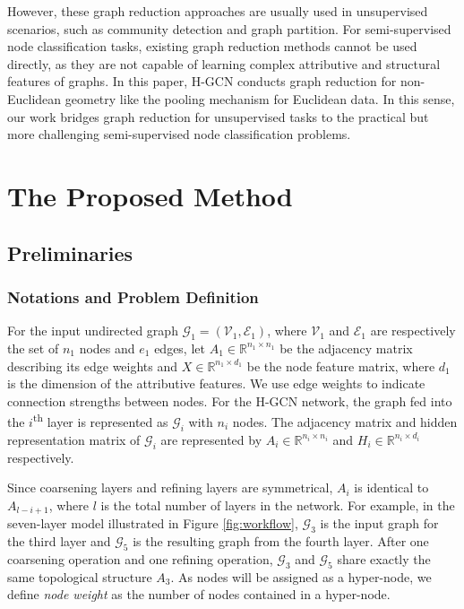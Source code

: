 \documentclass{article}
\begin{document}
However, these graph reduction approaches are usually used in unsupervised scenarios, such as community detection and graph partition. For semi-supervised node classification tasks, existing graph reduction methods cannot be used directly, as they are not capable of learning complex attributive and structural features of graphs. In this paper, H-GCN conducts graph reduction for non-Euclidean geometry like the pooling mechanism for Euclidean data. In this sense, our work bridges graph reduction for unsupervised tasks to the practical but more challenging semi-supervised node classification problems.
 \section{The Proposed Method}

\subsection{Preliminaries}

\subsubsection{Notations and Problem Definition}

For the input undirected graph $\mathcal{G}_1 = (\mathcal{V}_1, \mathcal{E}_1)$, where $\mathcal{V}_1$ and $\mathcal{E}_1$ are respectively the set of $n_1$ nodes and $e_1$ edges, let $A_1 \in \mathbb{R}^{n_1 \times n_1}$ be the adjacency matrix describing its edge weights and $X \in \mathbb{R}^{n_1 \times d_1}$ be the node feature matrix, where $d_1$ is the dimension of the attributive features. We use edge weights to indicate connection strengths between nodes. For the H-GCN network, the graph fed into the $i$\textsuperscript{th} layer is represented as $\mathcal{G}_i$ with $n_i$ nodes. The adjacency matrix and hidden representation matrix of $\mathcal{G}_i$ are represented by $A_i \in \mathbb{R}^{n_i \times n_i}$ and $H_i \in \mathbb{R}^{n_i \times d_i}$ respectively.

Since coarsening layers and refining layers are symmetrical, $A_i$ is identical to $A_{l - i + 1}$, where $l$ is the total number of layers in the network. For example, in the seven-layer model illustrated in Figure \ref{fig:workflow}, $\mathcal{G}_3$ is the input graph for the third layer and $\mathcal{G}_5$ is the resulting graph from the fourth layer. After one coarsening operation and one refining operation, $\mathcal{G}_3$ and $\mathcal{G}_5$ share exactly the same topological structure $A_3$. As nodes will be assigned as a hyper-node, we define {\it node weight} as the number of nodes contained in a hyper-node.
\end{document}
